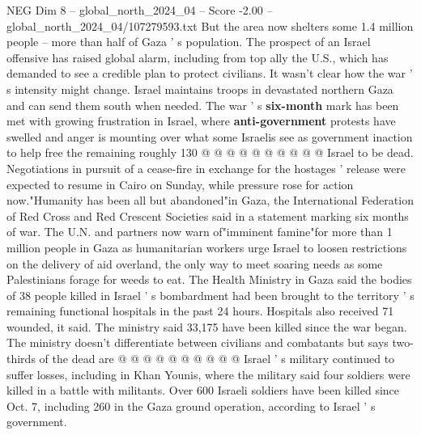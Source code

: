 \begin{textsample}{NEG Dim 8 – global\_north\_2024\_04 – Score -2.00 – global\_north\_2024\_04/107279593.txt}
But the area now shelters some 1.4 million people -- more than half of Gaza ' s population.
The prospect of an Israel offensive has raised global alarm, including from top ally the U.S., which has demanded to see a credible plan to protect civilians.
It wasn't clear how the war ' s intensity might change.
Israel maintains troops in devastated northern Gaza and can send them south when needed.
The war ' s \textbf{six-month} mark has been met with growing frustration in Israel, where \textbf{anti-government} protests have swelled and anger is mounting over what some Israelis see as government inaction to help free the remaining roughly 130 @ @ @ @ @ @ @ @ @ @ Israel to be dead.
Negotiations in pursuit of a cease-fire in exchange for the hostages ' release were expected to resume in Cairo on Sunday, while pressure rose for action now."Humanity has been all but abandoned"in Gaza, the International Federation of Red Cross and Red Crescent Societies said in a statement marking six months of war.
The U.N. and partners now warn of"imminent famine"for more than 1 million people in Gaza as humanitarian workers urge Israel to loosen restrictions on the delivery of aid overland, the only way to meet soaring needs as some Palestinians forage for weeds to eat.
The Health Ministry in Gaza said the bodies of 38 people killed in Israel ' s bombardment had been brought to the territory ' s remaining functional hospitals in the past 24 hours.
Hospitals also received 71 wounded, it said.
The ministry said 33,175 have been killed since the war began.
The ministry doesn't differentiate between civilians and combatants but says two-thirds of the dead are @ @ @ @ @ @ @ @ @ @ Israel ' s military continued to suffer losses, including in Khan Younis, where the military said four soldiers were killed in a battle with militants.
Over 600 Israeli soldiers have been killed since Oct. 7, including 260 in the Gaza ground operation, according to Israel ' s government.

\end{textsample}
